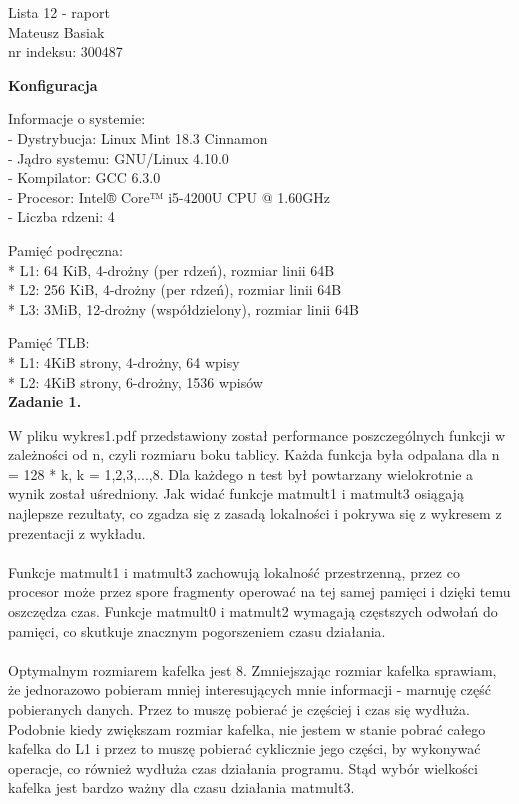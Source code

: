 \documentclass[a4paper]{article}
\begin{document}
\begin{center}
\Large
Lista 12 - raport\\
\large
Mateusz Basiak\\
nr indeksu: 300487
\normalsize
\end{center}
\textbf{Konfiguracja}

Informacje o systemie:\\
 - Dystrybucja: Linux Mint 18.3 Cinnamon\\
 - Jądro systemu: GNU/Linux 4.10.0\\
 - Kompilator: GCC 6.3.0\\
 - Procesor: Intel® Core™ i5-4200U CPU @ 1.60GHz\\
 - Liczba rdzeni: 4

Pamięć podręczna:\\
 * L1: 64 KiB, 4-drożny (per rdzeń), rozmiar linii 64B\\
 * L2: 256 KiB, 4-drożny (per rdzeń), rozmiar linii 64B\\
 * L3: 3MiB, 12-drożny (współdzielony), rozmiar linii 64B

Pamięć TLB:\\
 * L1: 4KiB strony, 4-drożny, 64 wpisy\\
 * L2: 4KiB strony, 6-drożny, 1536 wpisów\\


\textbf{Zadanie 1.}

W pliku wykres1.pdf przedstawiony został performance poszczególnych funkcji w zależności od n, czyli rozmiaru boku tablicy. Każda funkcja była odpalana dla n = 128 * k, k = 1,2,3,...,8. Dla każdego n test był powtarzany wielokrotnie a wynik został uśredniony. Jak widać funkcje matmult1 i matmult3 osiągają najlepsze rezultaty, co zgadza się z zasadą lokalności i pokrywa się z wykresem z prezentacji z wykładu.\\\\
Funkcje matmult1 i matmult3 zachowują lokalność przestrzenną, przez co procesor może przez spore fragmenty operować na tej samej pamięci i dzięki temu oszczędza czas. Funkcje matmult0 i matmult2 wymagają częstszych odwołań do pamięci, co skutkuje znacznym pogorszeniem czasu działania.\\\\
Optymalnym rozmiarem kafelka jest 8. Zmniejszając rozmiar kafelka sprawiam, że jednorazowo pobieram mniej interesujących mnie informacji - marnuję część pobieranych danych. Przez to muszę pobierać je częściej i czas się wydłuża. Podobnie kiedy zwiększam rozmiar kafelka, nie jestem w stanie pobrać całego kafelka do L1 i przez to muszę pobierać cyklicznie jego części, by wykonywać operacje, co również wydłuża czas działania programu. Stąd wybór wielkości kafelka jest bardzo ważny dla czasu działania matmult3.\\\\
\end{document}
